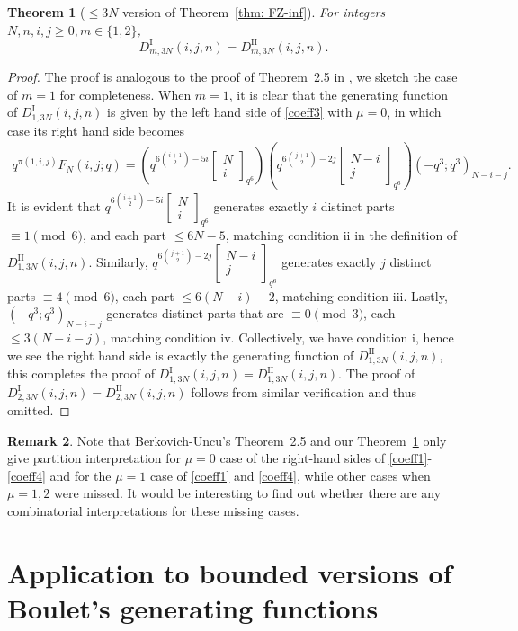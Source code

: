 \documentclass[12pt]{amsart}
\numberwithin{equation}{section}
\theoremstyle{plain}
\newtheorem{theorem}{Theorem}[section]
\theoremstyle{definition}
\newtheorem{remark}[theorem]{Remark}
\newcommand\qbin[3]{\left[\begin{matrix} #1 \\ #2 \end{matrix} \right]_{#3}}
\begin{document}
\begin{theorem}[$\leq 3N$ version of Theorem~\ref{thm: FZ-inf}]\label{thm: FZ-finite}
For integers $N,n,i,j\geq 0, m\in\{1,2\}$,
$$
D_{m,3N}^{\text{I}}(i,j,n)=D_{m,3N}^{\text{II}}(i,j,n).
$$
\end{theorem}
\begin{proof}
The proof is analogous to the proof of Theorem~2.5 in \cite{bu1}, we sketch the case of $m=1$ for completeness. When $m=1$, it is clear that the generating function of $D_{1,3N}^{\text{I}}(i,j,n)$ is given by the left hand side of \eqref{coeff3} with $\mu=0$, in which case its right hand side becomes
\begin{align*}
q^{\pi(1,i,j)}F_N(i,j;q)=\left(q^{6\binom{i+1}{2}-5i}\qbin{N}{i}{q^6}\right)\left(q^{6\binom{j+1}{2}-2j}\qbin{N-i}{j}{q^6}\right)(-q^3;q^3)_{N-i-j}.
\end{align*}
It is evident that $q^{6\binom{i+1}{2}-5i}\qbin{N}{i}{q^6}$ generates exactly $i$ distinct parts $\equiv 1 \pmod 6$, and each part $\leq 6N-5$, matching condition ii in the definition of $D_{1,3N}^{\text{II}}(i,j,n)$. Similarly, $q^{6\binom{j+1}{2}-2j}\qbin{N-i}{j}{q^6}$ generates exactly $j$ distinct parts $\equiv 4 \pmod 6$, each part $\leq 6(N-i)-2$, matching condition iii. Lastly, $(-q^3;q^3)_{N-i-j}$ generates distinct parts that are $\equiv 0 \pmod 3$, each $\leq 3(N-i-j)$, matching condition iv. Collectively, we have condition i, hence we see the right hand side is exactly the generating function of $D_{1,3N}^{\text{II}}(i,j,n)$, this completes the proof of $D_{1,3N}^{\text{I}}(i,j,n)=D_{1,3N}^{\text{II}}(i,j,n)$. The proof of $D_{2,3N}^{\text{I}}(i,j,n)=D_{2,3N}^{\text{II}}(i,j,n)$ follows from similar verification and thus omitted.
\end{proof}

\begin{remark}
Note that Berkovich-Uncu's Theorem~2.5 and our Theorem~\ref{thm: FZ-finite}
only give partition interpretation for $\mu=0$ case of the right-hand sides of \eqref{coeff1}-\eqref{coeff4} and 
for the $\mu=1$ case of \eqref{coeff1} and \eqref{coeff4}, 
 while other  
cases when  $\mu=1,2$ were missed. It would be interesting to find out whether there are 
any  combinatorial interpretations for  these missing cases.
\end{remark}








\section{Application to bounded versions of Boulet's generating functions}{\label{sec: mod2}}
\end{document}
